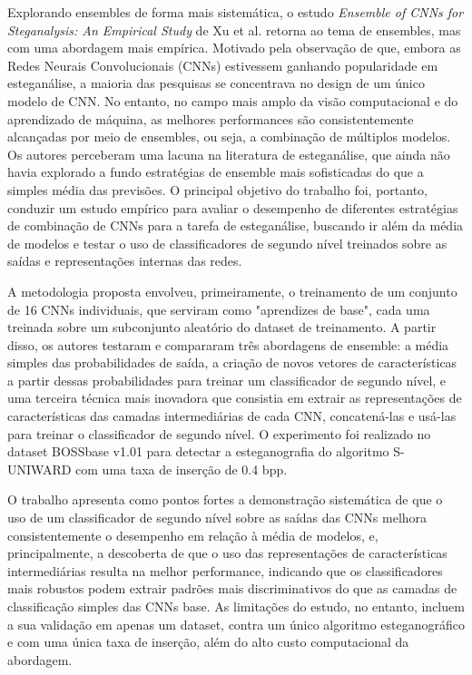 \documentclass[12pt]{article}
\begin{document}

Explorando ensembles de forma mais sistemática, o estudo \textit{Ensemble of
  CNNs for Steganalysis: An Empirical Study} de Xu et al. \cite{xu2016ensemble}
retorna ao tema de ensembles, mas com uma abordagem mais empírica. Motivado
pela observação de que, embora as Redes Neurais Convolucionais (CNNs)
estivessem ganhando popularidade em esteganálise, a maioria das pesquisas se
concentrava no design de um único modelo de CNN. No entanto, no campo mais
amplo da visão computacional e do aprendizado de máquina, as melhores
performances são consistentemente alcançadas por meio de ensembles, ou seja, a
combinação de múltiplos modelos. Os autores perceberam uma lacuna na literatura
de esteganálise, que ainda não havia explorado a fundo estratégias de ensemble
mais sofisticadas do que a simples média das previsões. O principal objetivo do
trabalho foi, portanto, conduzir um estudo empírico para avaliar o desempenho
de diferentes estratégias de combinação de CNNs para a tarefa de esteganálise,
buscando ir além da média de modelos e testar o uso de classificadores de
segundo nível treinados sobre as saídas e representações internas das redes.

A metodologia proposta envolveu, primeiramente, o treinamento de um conjunto de
16 CNNs individuais, que serviram como "aprendizes de base", cada uma treinada
sobre um subconjunto aleatório do dataset de treinamento. A partir disso, os
autores testaram e compararam três abordagens de ensemble: a média simples das
probabilidades de saída, a criação de novos vetores de características a partir
dessas probabilidades para treinar um classificador de segundo nível, e uma
terceira técnica mais inovadora que consistia em extrair as representações de
características das camadas intermediárias de cada CNN, concatená-las e usá-las
para treinar o classificador de segundo nível. O experimento foi realizado no
dataset BOSSbase v1.01 para detectar a esteganografia do algoritmo S-UNIWARD
com uma taxa de inserção de 0.4 bpp.

O trabalho apresenta como pontos fortes a demonstração sistemática de que o uso
de um classificador de segundo nível sobre as saídas das CNNs melhora
consistentemente o desempenho em relação à média de modelos, e, principalmente,
a descoberta de que o uso das representações de características intermediárias
resulta na melhor performance, indicando que os classificadores mais robustos
podem extrair padrões mais discriminativos do que as camadas de classificação
simples das CNNs base. As limitações do estudo, no entanto, incluem a sua
validação em apenas um dataset, contra um único algoritmo esteganográfico e com
uma única taxa de inserção, além do alto custo computacional da abordagem.
\end{document}
